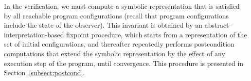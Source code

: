 In the  verification, we must compute a symbolic representation
that is satisfied by all reachable program configurations (recall that
program configurations include the state of the observer).
This invariant is obtained by an abstract-interpretation-based
fixpoint procedure, which starts
from a representation of the set of initial configurations, and
thereafter repeatedly performs
postcondition computations that extend the
symbolic representation by the effect of any execution step of the program,
until convergence.
This procedure is presented in Section~\ref{subsect:postcond}.




